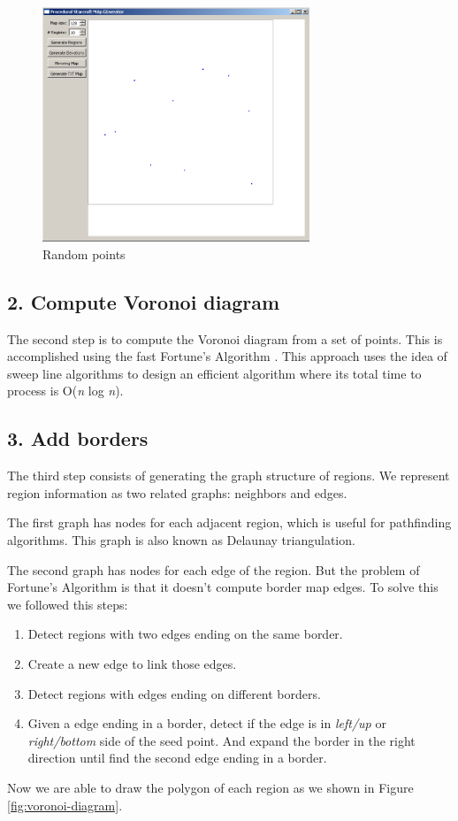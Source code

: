 \documentclass[letterpaper]{article}
\begin{document}
\begin{figure}[ht]
    \centering
    \includegraphics[width=8cm]{PCG01.png}
    \caption{Random points}
    \label{fig:random-points}
\end{figure}

\subsection{2. Compute Voronoi diagram}
The second step is to compute the Voronoi diagram from a set of points. This is accomplished using the fast Fortune's Algorithm \cite{Fortune}. This approach uses the idea of sweep line algorithms to design an efficient algorithm where its total time to process is O(\emph{n} log \emph{n}).

\subsection{3. Add borders}
The third step consists of generating the graph structure of regions. We represent region information as two related graphs: neighbors and edges.

The first graph has nodes for each adjacent region, which is useful for pathfinding algorithms. This graph is also known as Delaunay triangulation.

The second graph has nodes for each edge of the region. But the problem of Fortune's Algorithm is that it doesn't compute border map edges. To solve this we followed this steps:
\begin{enumerate}
	\item Detect regions with two edges ending on the same border.
	\item Create a new edge to link those edges.
	\item Detect regions with edges ending on different borders.
	\item Given a edge ending in a border, detect if the edge is in \emph{left/up} or \emph{right/bottom} side of the seed point. And expand the border in the right direction until find the second edge ending in a border.
\end{enumerate}
Now we are able to draw the polygon of each region as we shown in Figure \ref{fig:voronoi-diagram}.
\end{document}
